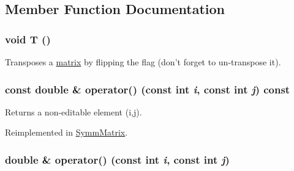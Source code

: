 \subsection{Member Function Documentation}
\hypertarget{classJKBuilder_1_1matrix_af2563817f6505e9f8a6ee5c5c209a115}{
\subsubsection[{T}]{\setlength{\rightskip}{0pt plus 5cm}void T ()}}
\label{classJKBuilder_1_1matrix_af2563817f6505e9f8a6ee5c5c209a115}


Transposes a \hyperlink{classJKBuilder_1_1matrix}{matrix} by flipping the flag (don't forget to un-\/transpose it). \hypertarget{classJKBuilder_1_1matrix_a9ccbac42f4eefb704f04886001f4fb3e}{
\subsubsection[{operator()}]{\setlength{\rightskip}{0pt plus 5cm}const double \& operator() (const int {\em i}, \/  const int {\em j}) const}}
\label{classJKBuilder_1_1matrix_a9ccbac42f4eefb704f04886001f4fb3e}


Returns a non-\/editable element (i,j). 

Reimplemented in \hyperlink{classJKBuilder_1_1SymmMatrix_a9ccbac42f4eefb704f04886001f4fb3e}{SymmMatrix}.\hypertarget{classJKBuilder_1_1matrix_a3d7fca183ff1c9f4c160218746f2ef31}{
\subsubsection[{operator()}]{\setlength{\rightskip}{0pt plus 5cm}double \& operator() (const int {\em i}, \/  const int {\em j})}}
\label{classJKBuilder_1_1matrix_a3d7fca183ff1c9f4c160218746f2ef31}


